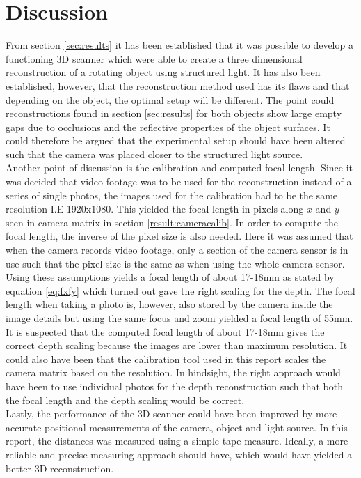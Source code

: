 \section{Discussion}

From section \ref{sec:results} it has been established that it was possible to develop a functioning 3D scanner which were able to create a three dimensional reconstruction of a rotating object using structured light. It has also been established, however, that the reconstruction method used has its flaws and that depending on the object, the optimal setup will be different. The point could reconstructions found in section \ref{sec:results} for both objects show large empty gaps due to occlusions and the reflective properties of the object surfaces. It could therefore be argued that the experimental setup should have been altered such that the camera was placed closer to the structured light source.\\

Another point of discussion is the calibration and computed focal length. Since it was decided that video footage was to be used for the reconstruction instead of a series of single photos, the images used for the calibration had to be the same resolution I.E 1920x1080. This yielded the focal length in pixels along $x$ and $y$ seen in camera matrix in section \ref{result:cameracalib}. In order to compute the focal length, the inverse of the pixel size is also needed. Here it was assumed that when the camera records video footage, only a section of the camera sensor is in use such that the pixel size is the same as when using the whole camera sensor. Using these assumptions yields a focal length of about 17-18mm as stated by equation \ref{eq:fxfy} which turned out gave the right scaling for the depth. The focal length when taking a photo is, however, also stored by the camera inside the image details but using the same focus and zoom yielded a focal length of 55mm. It is suspected that the computed focal length of about 17-18mm gives the correct depth scaling because the images are lower than maximum resolution. It could also have been that the calibration tool used in this report scales the camera matrix based on the resolution. In hindsight, the right approach would have been to use individual photos for the depth reconstruction such that both the focal length and the depth scaling would be correct.\\

Lastly, the performance of the 3D scanner could have been improved by more accurate positional measurements of the camera, object and light source. In this report, the distances was measured using a simple tape measure. Ideally, a more reliable and precise measuring approach should have, which would have yielded a better 3D reconstruction.   


